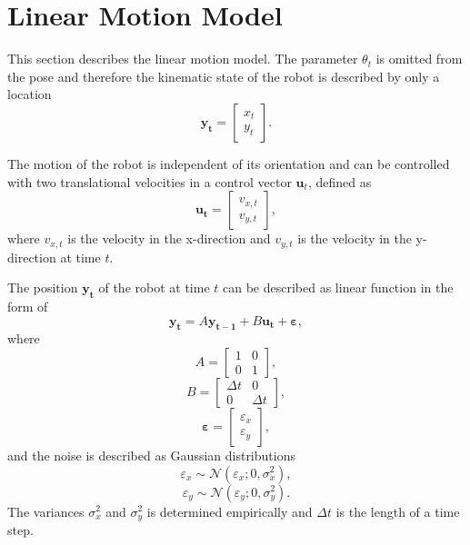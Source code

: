 \documentclass[12pt,oneside,openany,a4paper, %
afrikaans,english,
]{memoir}
\numberwithin{equation}{chapter}
\begin{document}
\section{Linear Motion Model}\label{linearmotionmodel}
This section describes the linear motion model. The parameter $\theta_t$ is omitted from the pose  and therefore the kinematic state of the robot is described by only a location
\begin{equation}
\bm{y_t} =
\begin{bmatrix}
x_t\\
y_t
\end{bmatrix}.
\end{equation}

The motion of the robot is independent of its orientation and can be controlled with two translational velocities in a control vector  $\bm{u}_t$, defined as
\begin{equation}
\bm{u_t} = 
\begin{bmatrix}
v_{x,t}\\
v_{y,t}
\end{bmatrix},
\end{equation}
where $v_{x,t}$ is the velocity in the x-direction and $v_{y,t}$ is the velocity in the y-direction at time $t$.

The position $\bm{y_t}$ of the robot at time $t$ can be described as linear function in the form of
\begin{equation}\label{eq:lineartrans}
\bm{y_t} = A \bm{y_{t - 1}} + B \bm{u_t} + \bm{\varepsilon},
\end{equation}
where
\begin{equation}
A =
\begin{bmatrix}
1 & 0\\
0 & 1
\end{bmatrix},
\end{equation}
\begin{equation}
B = \begin{bmatrix}
\Delta t & 0\\
0 & \Delta t
\end{bmatrix},
\end{equation}
\begin{equation}
\bm{\varepsilon} =
\begin{bmatrix}
\varepsilon_x\\
\varepsilon_y
\end{bmatrix},
\end{equation}
and the noise is described as Gaussian distributions
\begin{equation}
\varepsilon_x \sim \mathcal{N}(\varepsilon_x; 0, \sigma_x^2),
\end{equation}
\begin{equation}
\varepsilon_y \sim \mathcal{N}(\varepsilon_y; 0, \sigma_y^2).
\end{equation}
The variances $\sigma_x^2$ and $\sigma_y^2$ is determined empirically and $\Delta t$ is the length of a time step.
\end{document}
